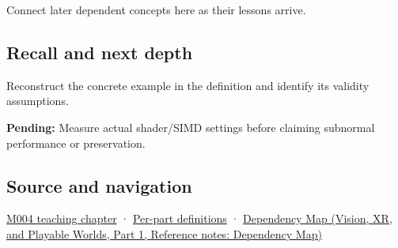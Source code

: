 \hypertarget{appendix-e979eb012782-used-by}{}

Connect later dependent concepts here as their lessons arrive.

\subsection{Recall and next depth}\label{appendix-e979eb012782-recall-and-next-depth}

\hypertarget{appendix-e979eb012782-recall-and-next-depth}{}

Reconstruct the concrete example in the definition and identify its validity assumptions.

\textbf{Pending:} Measure actual shader/SIMD settings before claiming subnormal performance or preservation.

\subsection{Source and navigation}\label{appendix-e979eb012782-source-and-navigation}

\hypertarget{appendix-e979eb012782-source-and-navigation}{}

\hyperref[01-foundations-i-ch001-a-stretching-ruler-for-real-valued-quantities]{M004 teaching chapter} · \hyperref[appendix-fd090d982a15-m004---parts-61-76]{Per-part definitions} · \href{../07-Vision-XR-and-Playable-Worlds-P01/main.pdf\#nameddest=appendix-4ad47bdd269a}{Dependency Map (Vision, XR, and Playable Worlds, Part 1, Reference notes: Dependency Map)}
